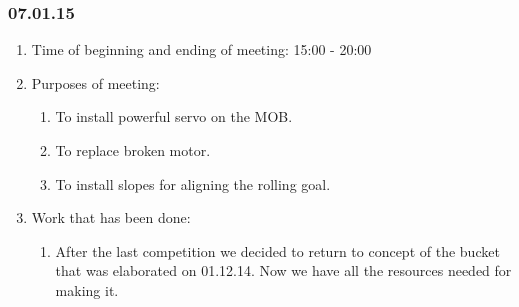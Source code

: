\subsubsection{07.01.15}

\begin{enumerate}
	\item Time of beginning and ending of meeting: 15:00 - 20:00
	
	\item Purposes of meeting:  
	\begin{enumerate}
		\item To install powerful servo on the MOB.
		
		\item To replace broken motor.
		
		\item To install slopes for aligning the rolling goal.
	\end{enumerate}
	
	\item Work that has been done:
	\begin{enumerate}
		
	  \item After the last competition we decided to return to concept of the bucket that was elaborated on 01.12.14. Now we have all the resources needed for making it.
	  

\end{enumerate}
\end{enumerate}
